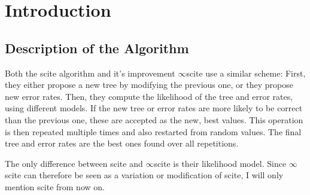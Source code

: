 \chapter{Introduction}
\label{ch:introduction}


\section{Description of the Algorithm}

Both the \ac{scite} algorithm and it's improvement $\infty$\ac{scite} use a similar scheme: First, they either propose a new tree by modifying the previous one, or they propose new error rates. Then, they compute the likelihood of the tree and error rates, using different models. If the new tree or error rates are more likely to be correct than the previous one, these are accepted as the new, best values. This operation is then repeated multiple times and also restarted from random values. The final tree and error rates are the best ones found over all repetitions.

The only difference between \ac{scite} and $\infty$\ac{scite} is their likelihood model. Since $\infty$\ac{scite} can therefore be seen as a variation or modification of \ac{scite}, I will only mention \ac{scite} from now on.